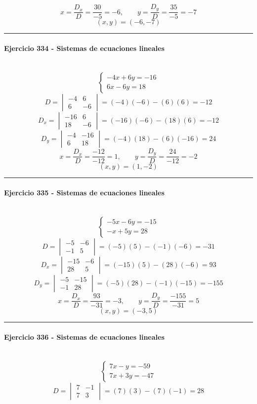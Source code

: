 \documentclass[10pt,a4paper]{article}
\newcommand{\res}[1]{\paragraph{#1}\mbox{}\\[-1.2em]}
\begin{document}
\[ x=\frac{D_x}{D}=\frac{30}{-5}=-6,\qquad y=\frac{D_y}{D}=\frac{35}{-5}=-7 \]
\[ \boxed{(x,y)=(-6,-7)} \]
\vspace{1mm}\hrule\vspace{2mm}
\res{Ejercicio 334 - Sistemas de ecuaciones lineales}
\[ \begin{cases}- 4 x + 6 y=-16\\6 x - 6 y=18\end{cases} \]
\[ D=\begin{vmatrix}-4&6\\6&-6\end{vmatrix}=(-4)(-6)-(6)(6)=-12 \]
\[ D_x=\begin{vmatrix}-16&6\\18&-6\end{vmatrix}=(-16)(-6)-(18)(6)=-12 \]
\[ D_y=\begin{vmatrix}-4&-16\\6&18\end{vmatrix}=(-4)(18)-(6)(-16)=24 \]
\[ x=\frac{D_x}{D}=\frac{-12}{-12}=1,\qquad y=\frac{D_y}{D}=\frac{24}{-12}=-2 \]
\[ \boxed{(x,y)=(1,-2)} \]
\vspace{1mm}\hrule\vspace{2mm}
\res{Ejercicio 335 - Sistemas de ecuaciones lineales}
\[ \begin{cases}- 5 x - 6 y=-15\\- x + 5 y=28\end{cases} \]
\[ D=\begin{vmatrix}-5&-6\\-1&5\end{vmatrix}=(-5)(5)-(-1)(-6)=-31 \]
\[ D_x=\begin{vmatrix}-15&-6\\28&5\end{vmatrix}=(-15)(5)-(28)(-6)=93 \]
\[ D_y=\begin{vmatrix}-5&-15\\-1&28\end{vmatrix}=(-5)(28)-(-1)(-15)=-155 \]
\[ x=\frac{D_x}{D}=\frac{93}{-31}=-3,\qquad y=\frac{D_y}{D}=\frac{-155}{-31}=5 \]
\[ \boxed{(x,y)=(-3,5)} \]
\vspace{1mm}\hrule\vspace{2mm}
\res{Ejercicio 336 - Sistemas de ecuaciones lineales}
\[ \begin{cases}7 x - y=-59\\7 x + 3 y=-47\end{cases} \]
\[ D=\begin{vmatrix}7&-1\\7&3\end{vmatrix}=(7)(3)-(7)(-1)=28 \]
\end{document}
